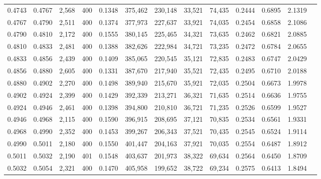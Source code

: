 \begin{tabular}{rrrrrrrrrrrrr}
0.4743 & 0.4767 &  2,568 & 400 &                                     0.1348 & 375,462 & 230,148 &  33,521 &  74,435 & 0.2444 & 0.6895 & 2.1319 \\
0.4767 & 0.4790 &  2,511 & 400 &                                     0.1374 & 377,973 & 227,637 &  33,921 &  74,035 & 0.2454 & 0.6858 & 2.1086 \\
0.4790 & 0.4810 &  2,172 & 400 &                                     0.1555 & 380,145 & 225,465 &  34,321 &  73,635 & 0.2462 & 0.6821 & 2.0885 \\
0.4810 & 0.4833 &  2,481 & 400 &                                     0.1388 & 382,626 & 222,984 &  34,721 &  73,235 & 0.2472 & 0.6784 & 2.0655 \\
0.4833 & 0.4856 &  2,439 & 400 &                                     0.1409 & 385,065 & 220,545 &  35,121 &  72,835 & 0.2483 & 0.6747 & 2.0429 \\
0.4856 & 0.4880 &  2,605 & 400 &                                     0.1331 & 387,670 & 217,940 &  35,521 &  72,435 & 0.2495 & 0.6710 & 2.0188 \\
0.4880 & 0.4902 &  2,270 & 400 &                                     0.1498 & 389,940 & 215,670 &  35,921 &  72,035 & 0.2504 & 0.6673 & 1.9978 \\
0.4902 & 0.4924 &  2,399 & 400 &                                     0.1429 & 392,339 & 213,271 &  36,321 &  71,635 & 0.2514 & 0.6636 & 1.9755 \\
0.4924 & 0.4946 &  2,461 & 400 &                                     0.1398 & 394,800 & 210,810 &  36,721 &  71,235 & 0.2526 & 0.6599 & 1.9527 \\
0.4946 & 0.4968 &  2,115 & 400 &                                     0.1590 & 396,915 & 208,695 &  37,121 &  70,835 & 0.2534 & 0.6561 & 1.9331 \\
0.4968 & 0.4990 &  2,352 & 400 &                                     0.1453 & 399,267 & 206,343 &  37,521 &  70,435 & 0.2545 & 0.6524 & 1.9114 \\
0.4990 & 0.5011 &  2,180 & 400 &                                     0.1550 & 401,447 & 204,163 &  37,921 &  70,035 & 0.2554 & 0.6487 & 1.8912 \\
0.5011 & 0.5032 &  2,190 & 401 &                                     0.1548 & 403,637 & 201,973 &  38,322 &  69,634 & 0.2564 & 0.6450 & 1.8709 \\
0.5032 & 0.5054 &  2,321 & 400 &                                     0.1470 & 405,958 & 199,652 &  38,722 &  69,234 & 0.2575 & 0.6413 & 1.8494 \\

\end{tabular}
